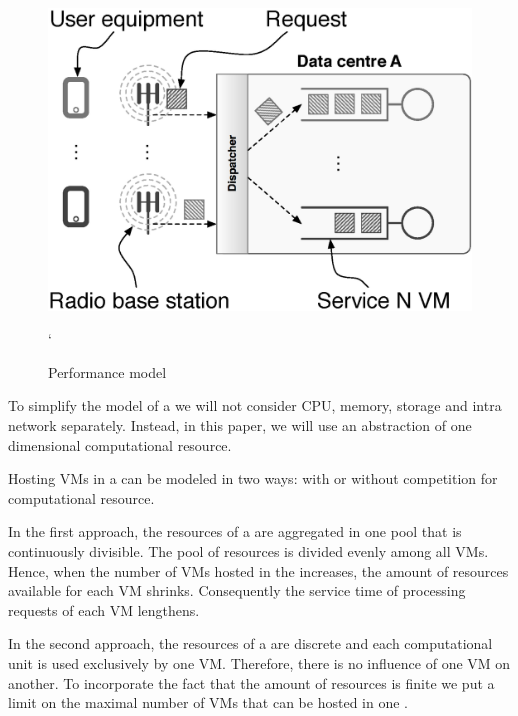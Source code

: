 \subsection{\Dc}
\begin{figure}[tb]
	\centering
	\includegraphics[width=\linewidth]{dc_model.eps} 
	\caption{Performance model}
	\label{fig:performance_model}`
\end{figure}

To simplify the model of a \dc{} we will not consider CPU, memory, storage and intra \dc{} network separately.
Instead, in this paper, we will use an abstraction of one dimensional computational resource.

Hosting VMs in a \dc{} can be modeled in two ways: with or without competition for computational resource.

In the first approach, the resources of a \dc{} are aggregated in one pool that is continuously divisible.
The pool of resources is divided evenly among all VMs.
Hence, when the number of VMs hosted in the \dc{} increases, the amount of resources available for each VM shrinks.
Consequently the service time of processing requests of each VM lengthens.

In the second approach, the resources of a \dc{} are discrete and each computational unit is used exclusively by one VM.
Therefore, there is no influence of one VM on another.
To incorporate the fact that the amount of resources is finite we put a limit on the maximal number of VMs that can be hosted in one \dc{}.

